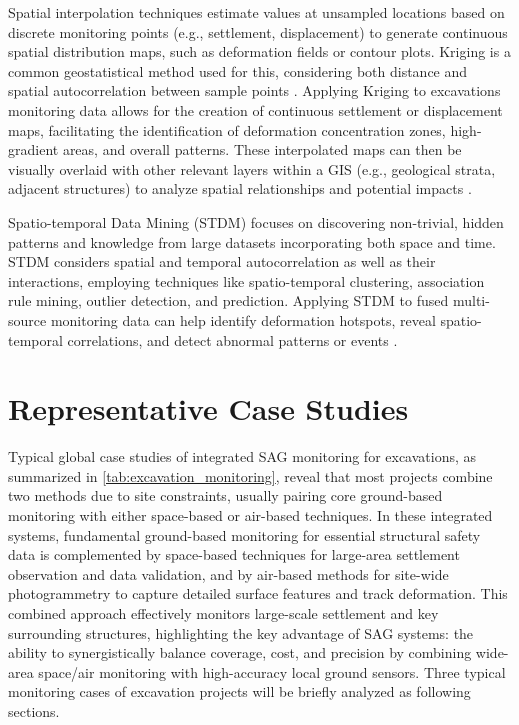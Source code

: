 \documentclass[preprint,11pt,authoryear,3p]{elsarticle}
\begin{document}
Spatial interpolation techniques estimate values at unsampled locations based on discrete monitoring points (e.g., settlement, displacement) to generate continuous spatial distribution maps, such as deformation fields or contour plots. Kriging is a common geostatistical method used for this, considering both distance and spatial autocorrelation between sample points \citep{TERRANOVA2015105}. Applying Kriging to excavations monitoring data allows for the creation of continuous settlement or displacement maps, facilitating the identification of deformation concentration zones, high-gradient areas, and overall patterns. These interpolated maps can then be visually overlaid with other relevant layers within a GIS (e.g., geological strata, adjacent structures) to analyze spatial relationships and potential impacts \citep{Spinetti18082019}.

Spatio-temporal Data Mining (STDM) focuses on discovering non-trivial, hidden patterns and knowledge from large datasets incorporating both space and time. STDM considers spatial and temporal autocorrelation as well as their interactions, employing techniques like spatio-temporal clustering, association rule mining, outlier detection, and prediction. Applying STDM to fused multi-source monitoring data can help identify deformation hotspots, reveal spatio-temporal correlations, and detect abnormal patterns or events \citep{FESTA20221}.

\section{Representative Case Studies}

Typical global case studies of integrated SAG monitoring for excavations, as summarized in \autoref{tab:excavation_monitoring}, reveal that most projects combine two methods due to site constraints, usually pairing core ground-based monitoring with either space-based or air-based techniques. In these integrated systems, fundamental ground-based monitoring for essential structural safety data is complemented by space-based techniques for large-area settlement observation and data validation, and by air-based methods for site-wide photogrammetry to capture detailed surface features and track deformation. This combined approach effectively monitors large-scale settlement and key surrounding structures, highlighting the key advantage of SAG systems: the ability to synergistically balance coverage, cost, and precision by combining wide-area space/air monitoring with high-accuracy local ground sensors. Three typical monitoring cases of excavation projects will be briefly analyzed as following sections.
\end{document}
